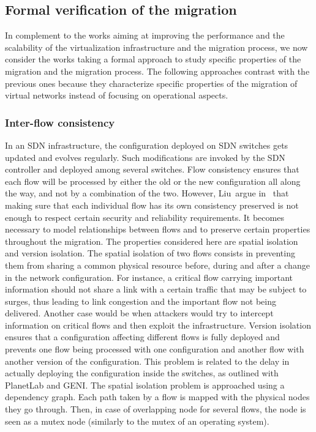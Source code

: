 \subsection{Formal verification of the migration}
In complement to the works aiming at improving the performance and the scalability of the virtualization infrastructure and the migration process, we now consider the works taking a formal approach to study specific properties of the migration and the migration process. 
The following approaches contrast with the previous ones because they characterize specific properties of the migration of virtual networks instead of focusing on operational aspects. 

\subsubsection{Inter-flow consistency}
In an SDN infrastructure, the configuration deployed on SDN switches gets updated and evolves regularly. Such modifications are invoked by the SDN controller and deployed among several switches.
Flow consistency ensures that each flow will be processed by either the old or the new configuration all along the way, and not by a combination of the two.
However, Liu~\etal argue in~\cite{Liu2015a} that making sure that each individual flow has its own consistency preserved is not enough to respect certain security and reliability requirements.
It becomes necessary to model relationships between flows and to preserve certain properties throughout the migration.
The properties considered here are spatial isolation and version isolation.
The spatial isolation of two flows consists in preventing them from sharing a common physical resource before, during and after a change in the network configuration.
For instance, a critical flow carrying important information should not share a link with a certain traffic that may be subject to surges, thus leading to link congestion and the important flow not being delivered. Another case would be when attackers would try to intercept information on critical flows and then exploit the infrastructure.
Version isolation ensures that a configuration affecting different flows is fully deployed and prevents one flow being processed with one configuration and another flow with another version of the configuration.
This problem is related to the delay in actually deploying the configuration inside the switches, as outlined with PlanetLab and GENI.
The spatial isolation problem is approached using a dependency graph. Each path taken by a flow is mapped with the physical nodes they go through. Then, in case of overlapping node for several flows, the node is seen as a mutex node (similarly to the mutex of an operating system).
